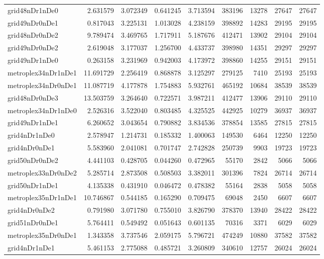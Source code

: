 \begin{longtable}{|l|r|r|r|r|r|r|r|r|}
grid48nDr1nDe0 & 2.631579 & 3.072349 & 0.641245 & 3.713594 & 383196 & 13278 & 27647 & 27647 \\
grid49nDr0nDe1 & 0.817043 & 3.225131 & 1.013028 & 4.238159 & 398892 & 14283 & 29195 & 29195 \\
grid48nDr0nDe2 & 9.789474 & 3.469765 & 1.717911 & 5.187676 & 412471 & 13902 & 29104 & 29104 \\
grid49nDr0nDe2 & 2.619048 & 3.177037 & 1.256700 & 4.433737 & 398980 & 14351 & 29297 & 29297 \\
grid49nDr1nDe0 & 0.263158 & 3.231969 & 0.942003 & 4.173972 & 398860 & 14255 & 29151 & 29151 \\
metroplex34nDr1nDe1 & 11.691729 & 2.256419 & 0.868878 & 3.125297 & 279125 & 7410 & 25193 & 25193 \\
metroplex34nDr0nDe1 & 11.087719 & 4.177878 & 1.754883 & 5.932761 & 465192 & 10684 & 38539 & 38539 \\
grid48nDr0nDe3 & 13.503759 & 3.264640 & 0.722571 & 3.987211 & 412477 & 13906 & 29110 & 29110 \\
metroplex34nDr1nDe0 & 2.526316 & 3.522040 & 0.803485 & 4.325525 & 442925 & 10279 & 36937 & 36937 \\
grid49nDr1nDe1 & 6.260652 & 3.043654 & 0.790882 & 3.834536 & 378854 & 13585 & 27815 & 27815 \\
grid4nDr1nDe0 & 2.578947 & 1.214731 & 0.185332 & 1.400063 & 149530 & 6464 & 12250 & 12250 \\
grid4nDr0nDe1 & 5.583960 & 2.041081 & 0.701747 & 2.742828 & 250739 & 9903 & 19723 & 19723 \\
grid50nDr0nDe2 & 4.441103 & 0.428705 & 0.044260 & 0.472965 & 55170 & 2842 & 5066 & 5066 \\
metroplex33nDr0nDe2 & 5.285714 & 2.873508 & 0.508503 & 3.382011 & 301396 & 7824 & 26714 & 26714 \\
grid50nDr1nDe1 & 4.135338 & 0.431910 & 0.046472 & 0.478382 & 55164 & 2838 & 5058 & 5058 \\
metroplex35nDr1nDe1 & 10.746867 & 0.544185 & 0.165290 & 0.709475 & 69048 & 2450 & 6607 & 6607 \\
grid4nDr0nDe2 & 0.791980 & 3.071780 & 0.755010 & 3.826790 & 378370 & 13940 & 28422 & 28422 \\
grid51nDr0nDe1 & 5.764411 & 0.549492 & 0.051643 & 0.601135 & 70316 & 3371 & 6029 & 6029 \\
metroplex35nDr0nDe1 & 1.343358 & 3.737546 & 2.059175 & 5.796721 & 474249 & 10880 & 37582 & 37582 \\
grid4nDr1nDe1 & 5.461153 & 2.775088 & 0.485721 & 3.260809 & 340610 & 12757 & 26024 & 26024 \\

\end{longtable}
